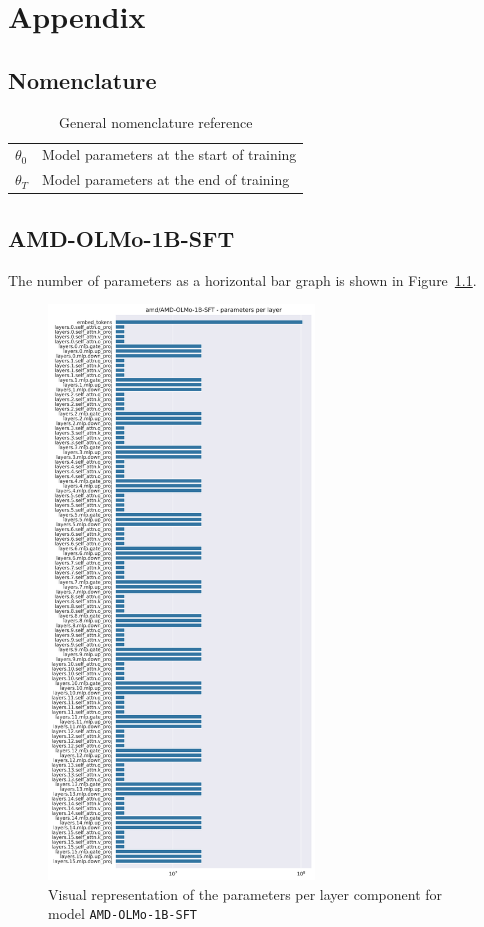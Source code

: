 \chapter{Appendix}
\section{Nomenclature}
\begin{table}[htb]
    \centering
    \begin{tabular}{ll}
        $\theta_0$ & Model parameters at the start of training \\ 
        $\theta_T$ & Model parameters at the end of training \\
    \end{tabular}
    \caption{General nomenclature reference}
    \label{tab:nomenclature}
\end{table}

\section{AMD-OLMo-1B-SFT}
The number of parameters as a horizontal bar graph is shown in Figure~\ref{fig:parameters_per_layer_amd_olmo}.
\begin{figure}[ht]
    \centering
    \includegraphics[width=0.63\textwidth]{figures/parameters_per_layer.png}
    \caption{Visual representation of the parameters per layer component for model \texttt{AMD-OLMo-1B-SFT}}
    \label{fig:parameters_per_layer_amd_olmo}
\end{figure}

